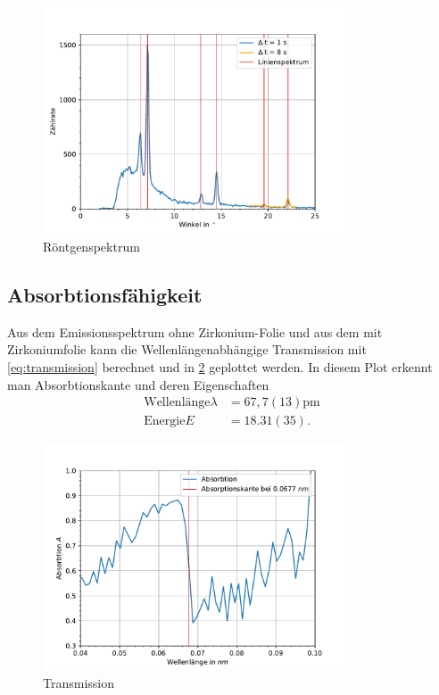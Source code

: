 \documentclass[11pt, a4paper]{article}
\begin{document}
    \begin{figure}
        \centering
        \includegraphics[width=0.8\textwidth]{NaCl-Spektrum.pdf}
        \caption{Röntgenspektrum}
        \label{fig:roentgenspektrum}
    \end{figure}

    \subsection{Absorbtionsfähigkeit}

    Aus dem Emissionsspektrum ohne Zirkonium-Folie und aus dem mit Zirkoniumfolie kann die Wellenlängenabhängige Transmission mit \ref{eq:transmission} berechnet und in \ref{fig:trans} geplottet werden. In diesem Plot erkennt man Absorbtionskante und deren Eigenschaften
    \begin{align}
        \text{Wellenlänge} \lambda &= 67,7(13) \si{\pico\meter}\\
        \text{Energie} E &= 18.31(35).
    \end{align}

    \begin{figure}
        \centering
        \includegraphics[width=0.8\textwidth]{Zirkonium.pdf}
        \caption{Transmission}
        \label{fig:trans}
    \end{figure}
\end{document}
